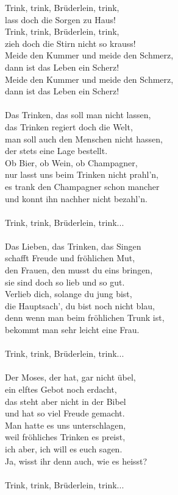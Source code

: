 \vspace{10pt}
Trink, trink, Brüderlein, trink,\\
lass doch die Sorgen zu Haus!\\
Trink, trink, Brüderlein, trink,\\
zieh doch die Stirn nicht so krauss!\\
Meide den Kummer und meide den Schmerz,\\
dann ist das Leben ein Scherz!\\
Meide den Kummer und meide den Schmerz,\\
dann ist das Leben ein Scherz!\\
\\
Das Trinken, das soll man nicht lassen,\\
das Trinken regiert doch die Welt,\\
man soll auch den Menschen nicht hassen,\\
der stets eine Lage bestellt.\\
Ob Bier, ob Wein, ob Champagner,\\
nur lasst uns beim Trinken nicht prahl'n,\\
es trank den Champagner schon mancher\\
und konnt ihn nachher nicht bezahl'n.\\
\\
Trink, trink, Brüderlein, trink...\\
\\
Das Lieben, das Trinken, das Singen\\
schafft Freude und fröhlichen Mut,\\
den Frauen, den musst du eins bringen,\\
sie sind doch so lieb und so gut.\\
Verlieb dich, solange du jung bist,\\
die Hauptsach', du bist noch nicht blau,\\
denn wenn man beim fröhlichen Trunk ist,\\
bekommt man sehr leicht eine Frau.\\
\\
Trink, trink, Brüderlein, trink...\\
\\
Der Moses, der hat, gar nicht übel,\\
ein elftes Gebot noch erdacht,\\
das steht aber nicht in der Bibel\\
und hat so viel Freude gemacht.\\
Man hatte es uns unterschlagen,\\
weil fröhliches Trinken es preist,\\
ich aber, ich will es euch sagen.\\
Ja, wisst ihr denn auch, wie es heisst?\\
\\
Trink, trink, Brüderlein, trink...
